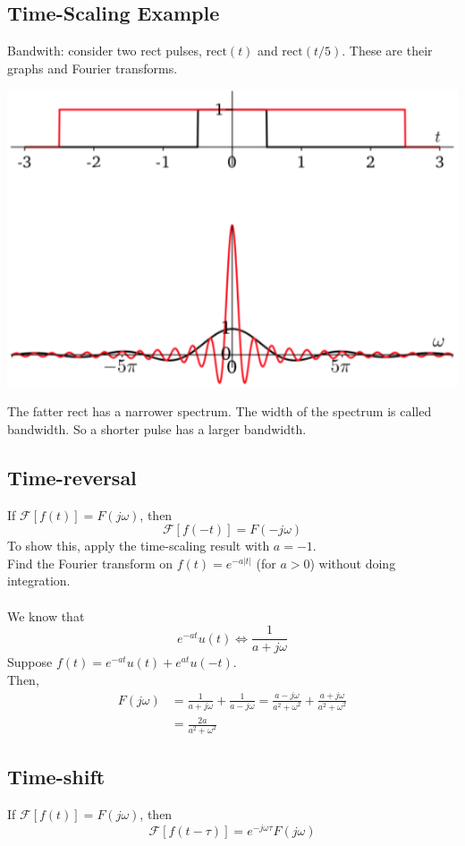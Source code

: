 \documentclass[10pt]{article}
\begin{document}
\subsection*{Time-Scaling Example}
Bandwith: consider two rect pulses, $\text{rect}(t)$ and $\text{rect}(t/5)$.  These are their graphs and Fourier transforms.
\begin{center}
    \includegraphics*[scale=0.8]{W5_6.png}
\end{center}
The fatter rect has a narrower spectrum.  The width of the spectrum is called bandwidth.  So a shorter pulse has a larger bandwidth.
\subsection*{Time-reversal}
If $\mathcal{F}[f(t)] = F(j\omega)$, then
\[\boxed{\mathcal{F}[f(-t)] = F(-j\omega)}\]
To show this, apply the time-scaling result with $a = -1$.\\
Find the Fourier transform on $f(t) = e^{-a|t|}$ (for $a > 0$) without doing integration.\\\\
We know that
\[e^{-at} u(t) \Longleftrightarrow \frac{1}{a + j\omega}\]
Suppose $f(t) = e^{-at} u(t) + e^{at} u(-t)$.\\
Then,
\begin{align*}
    F(j\omega) &= \frac{1}{a + j\omega} + \frac{1}{a - j\omega} = \frac{a - j\omega}{a^2 + \omega^2} + \frac{a + j\omega}{a^2 + \omega^2}\\
    &= \frac{2a}{a^2 + \omega^2}
\end{align*}



\subsection*{Time-shift}
If $\mathcal{F}[f(t)] = F(j\omega)$, then
\[\mathcal{F}[f(t - \tau)] = e^{-j\omega \tau} F(j\omega)\]
\end{document}
